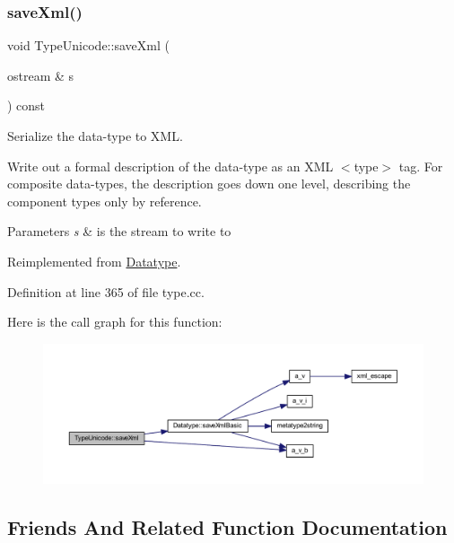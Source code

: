\subsubsection{\texorpdfstring{saveXml()}{saveXml()}}
{\footnotesize\ttfamily void Type\+Unicode\+::save\+Xml (\begin{DoxyParamCaption}\item[{ostream \&}]{s }\end{DoxyParamCaption}) const\hspace{0.3cm}{\ttfamily [virtual]}}



Serialize the data-\/type to X\+ML. 

Write out a formal description of the data-\/type as an X\+ML $<$type$>$ tag. For composite data-\/types, the description goes down one level, describing the component types only by reference. 
\begin{DoxyParams}{Parameters}
{\em s} & is the stream to write to \\
\hline
\end{DoxyParams}


Reimplemented from \mbox{\hyperlink{class_datatype_a33339824f1c50d4354952296070c3902}{Datatype}}.



Definition at line 365 of file type.\+cc.

Here is the call graph for this function\+:
\nopagebreak
\begin{figure}[H]
\begin{center}
\leavevmode
\includegraphics[width=350pt]{class_type_unicode_a4dada4691cd95b817fc6a0bd99031cd6_cgraph}
\end{center}
\end{figure}


\subsection{Friends And Related Function Documentation}
\mbox{\label{class_type_unicode_ac8c1945d0a63785e78b3e09a13226ed6}} 
